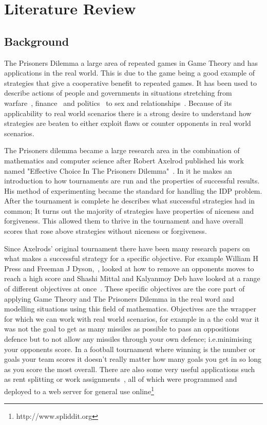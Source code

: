 
\chapter{Literature Review}\label{ch:literature}
\section{Background}\label{sec:background}
The Prisoners Dilemma a large area of repeated games in Game Theory and has applications in the real world.
This is due to the game being a good example of strategies that give a cooperative benefit to repeated games.
It has been used to describe actions of people and governments in situations stretching from warfare~\cite{tooby1988war,aumann1992handbook}, finance~\cite{cable1997finance} and politics~\cite{snidal1985Politics} to sex and relationships~\cite{low2015sex}.
Because of its applicability to real world scenarios there is a strong desire to understand how strategies are beaten to either exploit flaws or counter opponents in real world scenarios.

The Prisoners dilemma became a large research area in the combination of mathematics and computer science after Robert Axelrod published his work named "Effective Choice In The Prisoners Dilemma"~\cite{axelrod1980effective}.
In it he makes an introduction to how tournaments are run and the properties of successful results.
His method of experimenting became the standard for handling the IDP problem.
After the tournament is complete he describes what successful strategies had in common; 
It turns out the majority of strategies have properties of niceness and forgiveness.
This allowed them to thrive in the tournament and have overall scores that rose above strategies without niceness or forgiveness.

Since Axelrods' original tournament there have been many research papers on what makes a successful strategy for a specific objective.
For example William H Press and Freeman J Dyson,~\cite{press2012iterated}, looked at how to remove an opponents moves to reach a high score and Shashi Mittal and Kalyanmoy Deb have looked at a range of different objectives at once~\cite{mittal2009optimal}.
These specific objectives are the core part of applying Game Theory and The Prisoners Dilemma in the real word and modelling situations using this field of mathematics.
Objectives are the wrapper for which we can work with real world scenarios, for example in a the cold war it was not the goal to get as many missiles as possible to pass an oppositions defence but to not allow any missiles through your own defence; i.e.minimising your opponents score.
In a football tournament where winning is the number or goals your team scores it doesn't really matter how many goals you get in so long as you score the most overall.
There are also some very useful applications such as rent splitting or work assignments~\cite{goldman2015spliddit}, all of which were programmed and deployed to a web server for general use online\footnote{http://www.spliddit.org}


